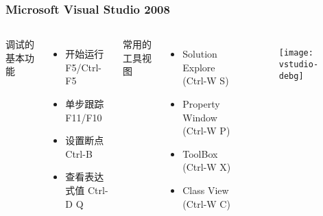 \begin{frame}
\frametitle{Microsoft Visual Studio 2008}
\begin{columns}
调试的基本功能
  \begin{itemize}
  \item 开始运行 F5/Ctrl-F5
  \item 单步跟踪 F11/F10
  \item 设置断点 Ctrl-B
  \item 查看表达式值 Ctrl-D Q
  \end{itemize}
常用的工具视图
  \begin{itemize}
  \item Solution Explore (Ctrl-W S)
  \item Property Window (Ctrl-W P)
  \item ToolBox (Ctrl-W X)
  \item Class View (Ctrl-W C)
  \end{itemize}
\begin{figure}
  \centering
  \texttt{[image: vstudio-debg]}
\end{figure}
\end{columns}
\end{frame}

